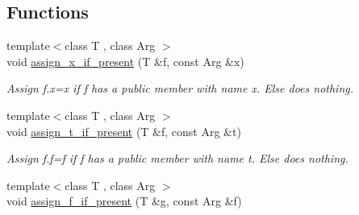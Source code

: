 \subsection*{Functions}
\begin{DoxyCompactItemize}
\item 
\hypertarget{namespaceSpacy_1_1FEniCS_ac42a8d576578dbe113e1b93450ed3d2c}{}{\footnotesize template$<$class T , class Arg $>$ }\\void \hyperlink{namespaceSpacy_1_1FEniCS_ac42a8d576578dbe113e1b93450ed3d2c}{assign\+\_\+x\+\_\+if\+\_\+present} (T \&f, const Arg \&x)\label{namespaceSpacy_1_1FEniCS_ac42a8d576578dbe113e1b93450ed3d2c}

\begin{DoxyCompactList}\small\item\em Assign f.\+x=x if f has a public member with name x. Else does nothing. \end{DoxyCompactList}\item 
\hypertarget{namespaceSpacy_1_1FEniCS_af23f1bf9e866dbce5fd71a36abc4fd17}{}{\footnotesize template$<$class T , class Arg $>$ }\\void \hyperlink{namespaceSpacy_1_1FEniCS_af23f1bf9e866dbce5fd71a36abc4fd17}{assign\+\_\+t\+\_\+if\+\_\+present} (T \&f, const Arg \&t)\label{namespaceSpacy_1_1FEniCS_af23f1bf9e866dbce5fd71a36abc4fd17}

\begin{DoxyCompactList}\small\item\em Assign f.\+f=f if f has a public member with name t. Else does nothing. \end{DoxyCompactList}\item 
\hypertarget{namespaceSpacy_1_1FEniCS_a847a1c704ef8c31faedcee55be860a25}{}{\footnotesize template$<$class T , class Arg $>$ }\\void \hyperlink{namespaceSpacy_1_1FEniCS_a847a1c704ef8c31faedcee55be860a25}{assign\+\_\+f\+\_\+if\+\_\+present} (T \&g, const Arg \&f)\label{namespaceSpacy_1_1FEniCS_a847a1c704ef8c31faedcee55be860a25}


\end{DoxyCompactItemize}
